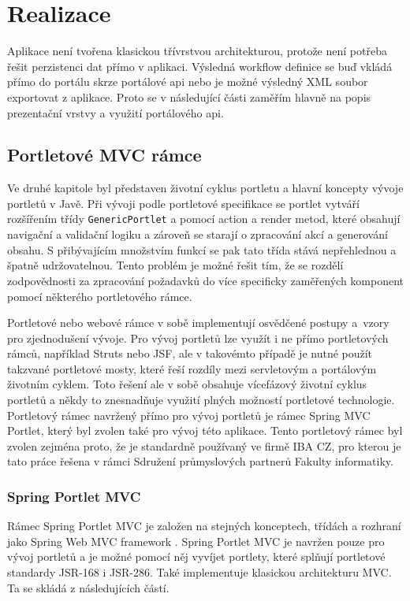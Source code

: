 \documentclass{fithesis}
\begin{document}
\begin{center}
\begin{longtable}{|p{5.5cm}|p{5.5cm}|}
\end{longtable}
\end{center}



\chapter{Realizace}
Aplikace není tvořena klasickou třívrstvou architekturou, protože není potřeba řešit perzistenci dat přímo v aplikaci. Výsledná workflow definice se buď vkládá přímo do portálu skrze portálové api nebo je možné výsledný XML soubor exportovat z aplikace. Proto se v následující části zaměřím hlavně na popis prezentační vrstvy a využití portálového api.

\section{Portletové MVC rámce}
Ve druhé kapitole byl představen životní cyklus portletu a hlavní koncepty vývoje portletů v Javě. Při vývoji podle portletové specifikace se portlet vytváří rozšířením třídy  \verb|GenericPortlet| a pomocí action a render metod, které obsahují navigační a validační logiku a zároveň se starají o zpracování akcí a generování obsahu. S přibývajícím množstvím funkcí se pak tato třída stává nepřehlednou a špatně udržovatelnou. Tento problém je možné řešit tím, že se rozdělí zodpovědnosti za zpracování požadavků do více specificky zaměřených komponent pomocí některého portletového rámce.

Portletové nebo webové rámce v sobě implementují osvědčené postupy a~vzory pro zjednodušení vývoje. Pro vývoj portletů lze využít i ne přímo portletových rámců, například Struts nebo JSF, ale v takovémto případě je nutné použít takzvané portletové mosty, které řeší rozdíly mezi servletovým a portálovým životním cyklem. Toto řešení ale v sobě obsahuje vícefázový životní cyklus portletů a někdy to znesnadňuje využití plných možností portletové technologie. Portletový rámec navržený přímo pro vývoj portletů je rámec Spring MVC Portlet, který byl zvolen také pro vývoj této aplikace. Tento portletový rámec byl zvolen zejména proto, že je standardně používaný ve firmě IBA CZ, pro kterou je tato práce řešena v rámci Sdružení průmyslových partnerů Fakulty informatiky.

\subsection*{Spring Portlet MVC}
Rámec Spring Portlet MVC je založen na stejných konceptech, třídách a rozhraní jako Spring Web MVC framework \cite{spring-web-mvc}. Spring Portlet MVC je navržen pouze pro vývoj portletů a je možné pomocí něj vyvíjet portlety, které splňují portletové standardy JSR-168 i JSR-286. Také implementuje klasickou architekturu MVC. Ta se skládá z následujících částí. \cite{mvc} 
\end{document}
